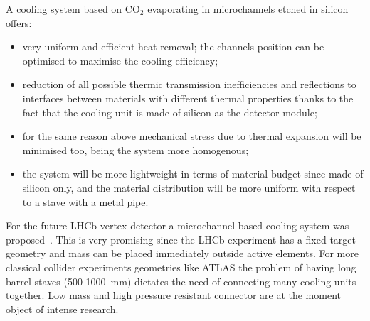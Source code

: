 A cooling system based on CO$_2$ evaporating in microchannels etched in silicon   offers:
\begin{itemize}
\item very uniform and efficient heat removal; the channels position can be optimised to maximise the 
cooling efficiency;
\item reduction of all possible thermic transmission inefficiencies and  reflections to interfaces between 
materials with different thermal properties thanks to the fact that the cooling unit is made of silicon as the 
detector module;
\item for the same reason above mechanical stress due to thermal expansion will be minimised too, being 
the system more homogenous;
\item the system will be more lightweight in terms of material budget since made of silicon only, and 
the material distribution will be more uniform with respect to a stave with a metal pipe.
\end{itemize}


For the future LHCb vertex detector a microchannel based cooling system was 
proposed~\cite{1748-0221-8-04-P04004}. This is very promising since the LHCb experiment has 
a fixed target geometry and mass can be placed immediately outside active elements. 
For more classical collider experiments geometries like ATLAS the problem of having long barrel staves 
(500-1000~mm) dictates the need of connecting many cooling units together. Low mass and high 
pressure resistant connector are at the moment object of intense research. 

